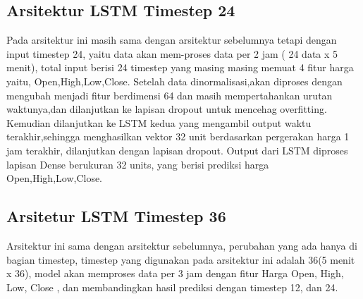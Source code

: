 \subsection{Arsitektur LSTM Timestep 24}
Pada arsitektur ini masih sama dengan arsitektur sebelumnya tetapi dengan input timestep 24, yaitu data akan mem-proses data per 2 jam ( 24 data x 5 menit), total input berisi 24 timestep yang masing masing memuat 4 fitur harga yaitu, Open,High,Low,Close.
Setelah data dinormalisasi,akan diproses dengan mengubah menjadi fitur berdimensi 64 dan masih mempertahankan urutan waktunya,dan  dilanjutkan ke lapisan dropout untuk mencehag overfitting. Kemudian dilanjutkan ke LSTM kedua yang mengambil output waktu terakhir,sehingga menghasilkan vektor 32 unit berdasarkan pergerakan harga 1 jam terakhir, dilanjutkan dengan lapisan dropout. Output dari LSTM diproses lapisan Dense berukuran 32 units, yang berisi prediksi harga Open,High,Low,Close.

\subsection{Arsitetur LSTM Timestep 36}


Arsitektur ini sama dengan arsitektur sebelumnya, perubahan yang ada hanya di bagian timestep, timestep yang digunakan pada arsitektur ini adalah 36(5 menit x 36), model akan memproses data per 3 jam dengan fitur Harga Open, High, Low, Close , dan membandingkan hasil prediksi dengan timestep 12, dan 24.



